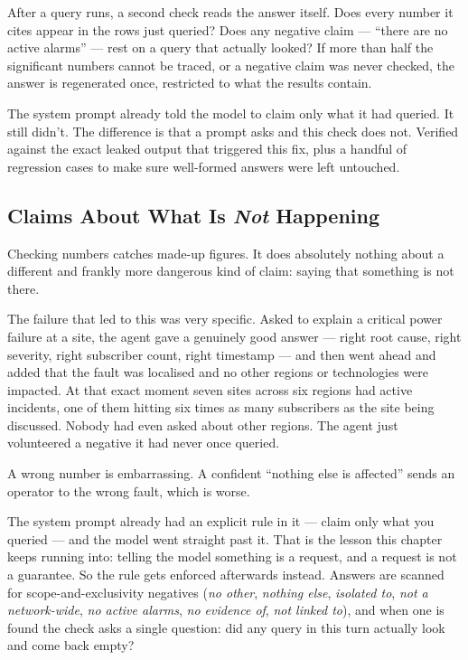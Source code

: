 After a query runs, a second check reads the answer itself. Does every number it
cites appear in the rows just queried? Does any negative claim --- ``there are
no active alarms'' --- rest on a query that actually looked? If more than half
the significant numbers cannot be traced, or a negative claim was never checked,
the answer is regenerated once, restricted to what the results contain.

The system prompt already told the model to claim only what it had queried. It
still didn't. The difference is that a prompt asks and this check does not.
 Verified against the exact leaked output
that triggered this fix, plus a handful of regression cases to make
sure well-formed answers were left untouched.


\subsection{Claims About What Is \emph{Not} Happening}

Checking numbers catches made-up figures. It does absolutely nothing about a
different and frankly more dangerous kind of claim: saying that something is
not there.

The failure that led to this was very specific. Asked to explain a critical
power failure at a site, the agent gave a genuinely good answer --- right root
cause, right severity, right subscriber count, right timestamp --- and then went
ahead and added that the fault was localised and no other regions or
technologies were impacted. At that exact moment seven sites across six regions
had active incidents, one of them hitting six times as many subscribers as the
site being discussed. Nobody had even asked about other regions. The agent just
volunteered a negative it had never once queried.

A wrong number is embarrassing. A confident ``nothing else is affected'' sends
an operator to the wrong fault, which is worse.

The system prompt already had an explicit rule in it --- claim only what you
queried --- and the model went straight past it. That is the lesson this chapter
keeps running into: telling the model something is a request, and a request is
not a guarantee. So the rule gets enforced afterwards instead. Answers are scanned for
scope-and-exclusivity negatives (\emph{no other}, \emph{nothing else},
\emph{isolated to}, \emph{not a network-wide}, \emph{no active alarms},
\emph{no evidence of}, \emph{not linked to}), and when one is found the check
asks a single question: did any query in this turn actually look and come back
empty?

